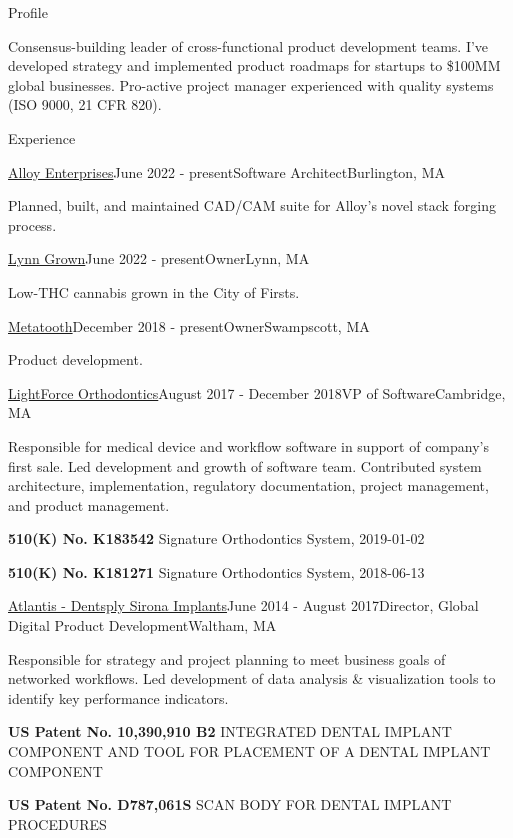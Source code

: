 \documentclass{resume}
\begin{document}
  
\begin{rSection}{Profile}
\item Consensus-building leader of cross-functional product development teams. I've developed strategy and implemented product roadmaps for startups to \$100MM global businesses. Pro-active project manager experienced with quality systems (ISO 9000, 21 CFR 820).
\end{rSection}

\begin{rSection}{Experience}

\begin{rSubsection}{\href{https://alloyenterprises.co}{Alloy Enterprises}}{June 2022 - present}{Software Architect}{Burlington, MA}
\item Planned, built, and maintained CAD/CAM suite for Alloy's novel stack forging process.
\end{rSubsection}

\begin{rSubsection}{\href{https://lynngrown.com}{Lynn Grown}}{June 2022 - present}{Owner}{Lynn, MA}
\item Low-THC cannabis grown in the City of Firsts.
\end{rSubsection}

\begin{rSubsection}{\href{https://metatooth.com}{Metatooth}}{December 2018 - present}{Owner}{Swampscott, MA}
\item Product development.
\end{rSubsection}

\begin{rSubsection}{\href{https://lightforceortho.com}{LightForce Orthodontics}}{August 2017 - December 2018}{VP of Software}{Cambridge, MA}
\item Responsible for medical device and workflow software in support of company's first sale.  Led development and growth of software team. Contributed system architecture, implementation, regulatory documentation, project management, and product management.
\item \textbf{510(K) No. K183542} Signature Orthodontics System, 2019-01-02
\item \textbf{510(K) No. K181271} Signature Orthodontics System, 2018-06-13
\end{rSubsection}


\begin{rSubsection}{\href{https://dentsplysirona.com}{Atlantis - Dentsply Sirona Implants}}{June 2014 - August 2017}{Director, Global Digital Product Development}{Waltham, MA}
\item Responsible for strategy and project planning to meet business goals of networked workflows.  Led development of data analysis \& visualization tools to identify key performance indicators.
\item \textbf{US Patent No. 10,390,910 B2} INTEGRATED DENTAL IMPLANT COMPONENT AND TOOL FOR PLACEMENT OF A DENTAL IMPLANT COMPONENT
\item \textbf{US Patent No. D787,061S} SCAN BODY FOR DENTAL IMPLANT PROCEDURES
\end{rSubsection}


\end{rSection}
\end{document}
